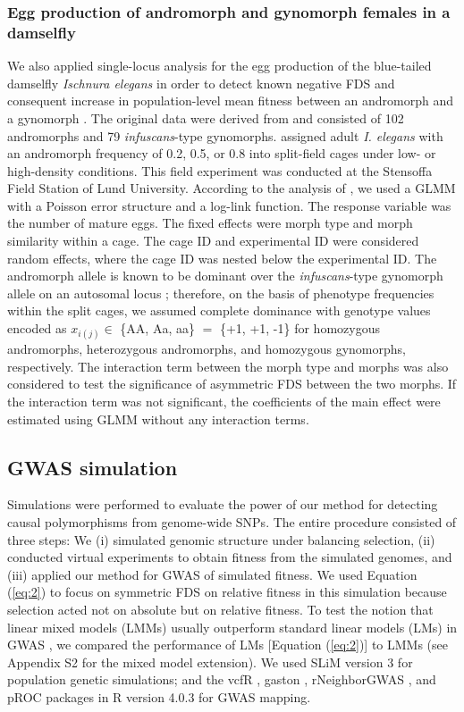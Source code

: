 \documentclass[12pt,]{article}
\begin{document}
\subsubsection{Egg production of andromorph and gynomorph females in a damselfly}
We also applied single-locus analysis for the egg production of the blue-tailed damselfly \textit{Ischnura elegans} in order to detect known negative FDS and consequent increase in population-level mean fitness between an andromorph and a gynomorph \citep{takahashi2014evolution, le2015evolutionary}. The original data were derived from \cite{takahashi2014evolution} and consisted of 102 andromorphs and 79 \textit{infuscans}-type gynomorphs. \cite{takahashi2014evolution} assigned adult \textit{I. elegans} with an andromorph frequency of 0.2, 0.5, or 0.8 into split-field cages under low- or high-density conditions. This field experiment was conducted at the Stensoffa Field Station of Lund University. According to the analysis of \cite{takahashi2014evolution}, we used a GLMM with a Poisson error structure and a log-link function. The response variable was the number of mature eggs. The fixed effects were morph type and morph similarity within a cage. The cage ID and experimental ID were considered random effects, where the cage ID was nested below the experimental ID. The andromorph allele is known to be dominant over the \textit{infuscans}-type gynomorph allele on an autosomal locus \citep{sanchez2005hybridization}; therefore, on the basis of phenotype frequencies within the split cages, we assumed complete dominance with genotype values encoded as $x_{i(j)} \in$ \{AA, Aa, aa\} $=$ \{+1, +1, -1\} for homozygous andromorphs, heterozygous andromorphs, and homozygous gynomorphs, respectively. The interaction term between the morph type and morphs was also considered to test the significance of asymmetric FDS between the two morphs. If the interaction term was not significant, the coefficients of the main effect were estimated using GLMM without any interaction terms.


\subsection{GWAS simulation}
Simulations were performed to evaluate the power of our method for detecting causal polymorphisms from genome-wide SNPs. The entire procedure consisted of three steps: We (i) simulated genomic structure under balancing selection, (ii) conducted virtual experiments to obtain fitness from the simulated genomes, and (iii) applied our method for GWAS of simulated fitness. We used Equation (\ref{eq:2}) to focus on symmetric FDS on relative fitness in this simulation because selection acted not on absolute but on relative fitness. To test the notion that linear mixed models (LMMs) usually outperform standard linear models (LMs) in GWAS \citep{kang2008efficient}, we compared the performance of LMs [Equation (\ref{eq:2})] to LMMs (see Appendix S2 for the mixed model extension). We used SLiM version 3 \citep{haller_slim_2019} for population genetic simulations; and the vcfR \citep{knaus2017vcfr}, gaston \citep{R_gaston}, rNeighborGWAS \citep{sato2019neighbor}, and pROC \citep{R_pROC} packages in R version 4.0.3 \citep{R_citation} for GWAS mapping.
\end{document}
